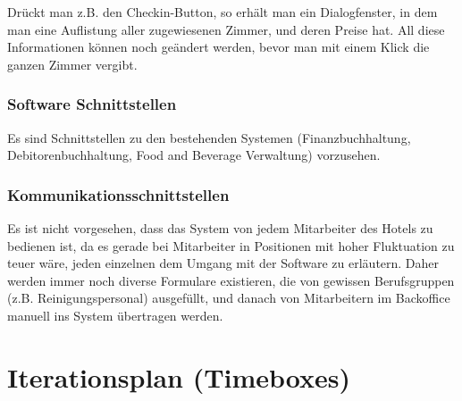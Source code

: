 \documentclass[10pt,a4paper,titlepage]{article}
\begin{document}
Drückt man z.B. den  \Gls{Checkin}-Button, so erhält man ein Dialogfenster, in dem man eine Auflistung aller zugewiesenen \Gls{Zimmer}, und deren Preise hat. All diese Informationen können noch geändert werden, bevor man mit einem Klick die ganzen \Gls{Zimmer} vergibt.
\subsubsection{Software Schnittstellen}
Es sind Schnittstellen zu den bestehenden Systemen (Finanzbuchhaltung, Debitorenbuchhaltung, Food and Beverage Verwaltung) vorzusehen.
\subsubsection{Kommunikationsschnittstellen}
Es ist nicht vorgesehen, dass das System von jedem \Gls{Mitarbeiter} des Hotels zu bedienen ist, da es gerade bei \Gls{Mitarbeiter} in Positionen mit hoher Fluktuation zu teuer wäre, jeden einzelnen dem Umgang mit der Software zu erläutern. Daher werden immer noch diverse Formulare existieren, die von gewissen Berufsgruppen (z.B. Reinigungspersonal) ausgefüllt, und danach von \Gls{Mitarbeiter}n im \Gls{Backoffice} manuell ins System übertragen werden.

\newpage

\section{Iterationsplan (Timeboxes)}


\newpage

\printglossary[title=Glossar,toctitle=GLOSSAR]
\end{document}
